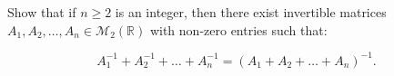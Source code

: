 Show that if $n\ge 2$ is an integer, then there exist invertible matrices $A_1, A_2, \ldots, A_n \in \mathcal{M}_2(\mathbb{R})$ with non-zero entries such that:

\[A_1^{-1} + A_2^{-1} + \ldots + A_n^{-1} = (A_1 + A_2 + \ldots + A_n)^{-1}.\]
